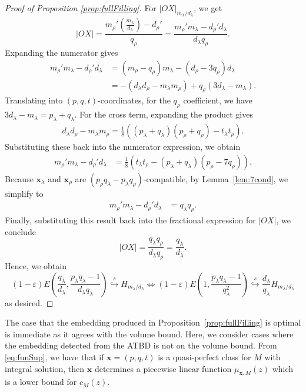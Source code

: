 \documentclass[11pt, reqno]{amsart}
\theoremstyle{remark}
\numberwithin{equation}{subsection}
\numberwithin{figure}{section}
\theoremstyle{customremark}
\newcommand{\la}{{\lambda}}
\newcommand{\eps}{\varepsilon}
\newcommand{\sembeds}{\stackrel{s}{\hookrightarrow}}
\begin{document}
\begin{proof}[Proof of Proposition \ref{prop:fullFilling}]
For $|OX|_{m_\la/d_\la}$, we get
\begin{equation*}
    |OX| = \frac{m_\rho' \left(\frac{m_\lambda}{d_\lambda}\right) - d_\rho'}{q_\rho} = \frac{m_\rho' m_\lambda - d_\rho' d_\lambda}{d_\lambda q_\rho}.
\end{equation*}
Expanding the numerator gives
\begin{align*}
    m_\rho' m_\lambda - d_\rho' d_\lambda &= (m_\rho - q_\rho)m_\lambda - (d_\rho - 3q_\rho)d_\lambda \\
    &= -(d_\lambda d_\rho - m_\lambda m_\rho) + q_\rho(3d_\lambda - m_\lambda).
\end{align*}
Translating into $(p,q,t)$-coordinates, for the $q_\rho$ coefficient, we have $3d_\lambda - m_\lambda = p_\lambda + q_\lambda.$
For the cross term, expanding the product gives
\begin{align*}
    d_\lambda d_\rho - m_\lambda m_\rho = \frac{1}{8} \left( (p_\lambda+q_\lambda)(p_\rho+q_\rho) - t_\lambda t_\rho \right).
\end{align*}
Substituting these back into the numerator expression, we obtain
\begin{align*}
    m_\rho' m_\lambda - d_\rho' d_\lambda
    &= \frac{1}{8} \left( t_\lambda t_\rho - (p_\lambda+q_\lambda)(p_\rho - 7q_\rho) \right).
\end{align*}
Because $\bm{x}_\lambda$ and $\bm{x}_\rho$ are $(p_\rho q_\lambda - p_\lambda q_\rho)$-compatible, by Lemma~\ref{lem:7cond}, we simplify to 
\begin{align*}
    m_\rho' m_\lambda - d_\rho' d_\lambda &= q_\la q_\rho.
\end{align*}
Finally, substituting this result back into the fractional expression for $|OX|$, we conclude
\begin{equation*}
    |OX| = \frac{q_\lambda q_\rho}{d_\lambda q_\rho} = \frac{q_\lambda}{d_\lambda}.
\end{equation*}
Hence, we obtain 
\[ (1-\eps)E\left( \frac{q_\la}{d_\la},\frac{p_\la q_\la-1}{d_\la q_\la}\right) \sembeds H_{m_\la/d_\la} \iff (1-\eps)E\left(1,\frac{p_\la q_\la-1}{q_\la^2}\right) \sembeds \frac{d_\la}{q_\la}H_{m_\la/d_\la}\]
as desired. 
\end{proof}

The case that the embedding produced in Proposition~\ref{prop:fullFilling} is optimal is immediate as it agrees with the volume bound. Here, we consider cases where the embedding detected from the ATBD is not on the volume bound. From \eqref{eq:funSup}, we have that if $\bm{x}=(p,q,t)$ is a quasi-perfect class for $M$ with integral solution, then  $\bm{x}$ determines a piecewise linear function $\mu_{\bm{x},M}(z)$ which is a lower bound for $c_{M}(z).$
\end{document}
